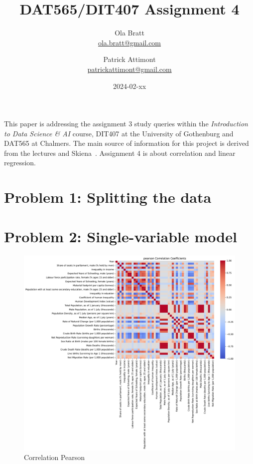 \documentclass[a4paper]{article}
\begin{document}
\author{Ola Bratt \\
  \href{mailto:ola.bratt@gmail.com}{ola.bratt@gmail.com}
  \and
  Patrick Attimont \\
  \href{patrickattimont@gmail.com}{patrickattimont@gmail.com}
}

\title{DAT565/DIT407 Assignment 4}
\date{2024-02-xx}

\maketitle

This paper is addressing the assignment 3 study queries within the \emph{Introduction to Data Science \& AI} course, DIT407 at 
the University of Gothenburg and DAT565 at Chalmers. The main source of information for this project
is derived from the lectures and Skiena~\cite{Skiena:2024}. Assignment 4 is about correlation and linear regression.

\section*{Problem 1: Splitting the data}

\section*{Problem 2: Single-variable model}


\begin{figure}[h]
  \begin{center}
    \includegraphics[width=\textwidth]{ola/pearson_correlation.pdf}
    \caption{Correlation Pearson}
    \label{fig:pearson_correlation}
  \end{center}
\end{figure}
\end{document}
